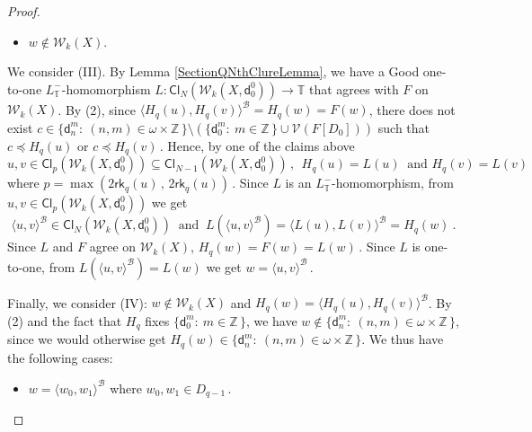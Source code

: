 \documentclass[10pt,a4paper, openany,  oldfontcommands]{memoir}
\newtheorem{open problem} [theorem] {Open Problem}
\newtheorem{open question} [theorem] {Open Question}
\begin{document}
\begin{proof}
\begin{itemize}
\item[(IV)]   $  w    \not\in  \mathcal{W}_k  \left( X  \right)  $. 
\end{itemize} 
  We consider (III). 
  By Lemma    \ref{SectionQNthClureLemma}, 
we have a  \textsf{Good}   one-to-one  $  L_{  \mathbb{T} }^- $-homomorphism   
 $L  :    \mathsf{Cl}_N  \left(    \mathcal{W}_k  \left( X    ,  \mathsf{d}^0_0 \right)    \right)  \to  \mathbb{T} $ 
 that agrees with $F$ on   $  \mathcal{W}_k  \left( X  \right)  $.  
 By (2),  
 since  $  \langle  H_q(u) , H_q (v)  \rangle^{  \mathcal{B}  }    =  H_q  (w) = F(w)   $, 
 there does not exist   $ c  \in  \big\{  \mathsf{d}^m_n :   \  (n, m  )  \in  \omega  \times  \mathbb{Z}  \,  \rbrace 
\setminus  \left(    \big\{  \mathsf{d}^m_0 :   \   m  \in   \mathbb{Z}  \,  \rbrace   \cup  \mathcal{V} \left(  F  \left[ D_0  \right]  \right)    \right)   $ 
such that  $  c  \preceq  H_q (u)     $  or  $  c  \preceq    H_q (v)       \,    $. 
Hence, by  one of the claims above 
\[
u, v  \in    \mathsf{Cl}_{  p  }  \left(    \mathcal{W}_k  \left( X   ,  \mathsf{d}^0_0 \right)    \right)
\subseteq    \mathsf{Cl}_{   N -1 }  \left(    \mathcal{W}_k  \left( X   ,  \mathsf{d}^0_0  \right)    \right)
\,   ,  \    \   
H_q (u)  =  L(u)  
\   \mbox{  and  }   H_q  (v)  =  L(v) 
\]
where   $  p   =  \max \left(  2  \mathsf{rk}_q  \left(  u \right)  \,  ,  \,    2  \mathsf{rk}_q  \left(  u \right)     \right)       \,     $. 
Since  $  L  $  is an  $  L_{  \mathbb{T}  }^- $-homomorphism, 
from $  u, v  \in    \mathsf{Cl}_{  p  }  \left(    \mathcal{W}_k  \left( X   ,  \mathsf{d}^0_0  \right)    \right)  $  we get  
\[
 \langle u, v  \rangle^{  \mathcal{B}  }  \in      \mathsf{Cl}_{   N  }  \left(    \mathcal{W}_k  \left( X   ,  \mathsf{d}^0_0  \right)    \right)
 \     \mbox{  and  }   \  
 L  \left(     \langle u, v  \rangle^{  \mathcal{B}  }    \right)   =  
  \langle  L(u) ,  L(v)   \rangle^{  \mathcal{B}  }   = H_q  (w)  
  \     .
\] 
Since  $L$  and  $F$ agree on   $    \mathcal{W}_k  \left( X  \right)     $,  
  $  H_q (w)  = F(w)  =    L(w)    \,  $.
Since  $    L$  is one-to-one,  
from    $   L  \left(     \langle u, v  \rangle^{  \mathcal{B}  }    \right)   =  L(w)  $  we get  
$  w  =      \langle u, v  \rangle^{  \mathcal{B}  }   \,       $. 





Finally,  we consider (IV):    $  w    \not\in  \mathcal{W}_k  \left( X  \right)  $   and  
$  H_q (w)  =  \langle  H_q(u) , H_q (v)  \rangle^{  \mathcal{B}  }  $.
By (2) and the fact that  $  H_q  $  fixes  $  \big\{  \mathsf{d}^m_0  :   \   m  \in  \mathbb{Z} \,      \big\} $, 
we have  $  w  \not\in   \big\{  \mathsf{d}^m_n  :   \   (n, m)     \in    \omega  \times  \mathbb{Z} \,      \big\}   $,  
since we would otherwise  get  $  H_q  (w)  \in  \big\{  \mathsf{d}^m_n  :   \   (n, m)    \in    \omega  \times  \mathbb{Z} \,      \big\}   $.
We thus have the following cases:  
\begin{itemize}
\item[(IVa)]  $     w  =  \langle w_0 ,  w_1   \rangle^{  \mathcal{B}  }  $  where  
$  w_0, w_1  \in  D_{q-1}      \,  $.





\end{itemize}
\end{proof}
\end{document}

